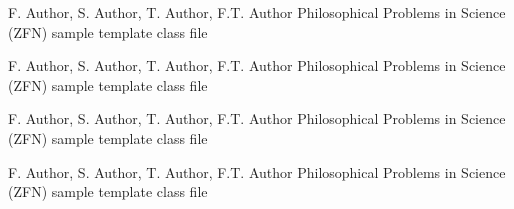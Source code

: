 
\begin{tocitem}
{F. Author, S. Author, T. Author, F.T. Author}
{Philosophical Problems in Science (ZFN) sample template class file}

\end{tocitem}


\begin{tocitem}
{F. Author, S. Author, T. Author, F.T. Author}
{Philosophical Problems in Science (ZFN) sample template class file}

\end{tocitem}

\begin{tocitem}
{F. Author, S. Author, T. Author, F.T. Author}
{Philosophical Problems in Science (ZFN) sample template class file}

\end{tocitem}


\begin{tocitem}
{F. Author, S. Author, T. Author, F.T. Author}
{Philosophical Problems in Science (ZFN) sample template class file}

\end{tocitem}

